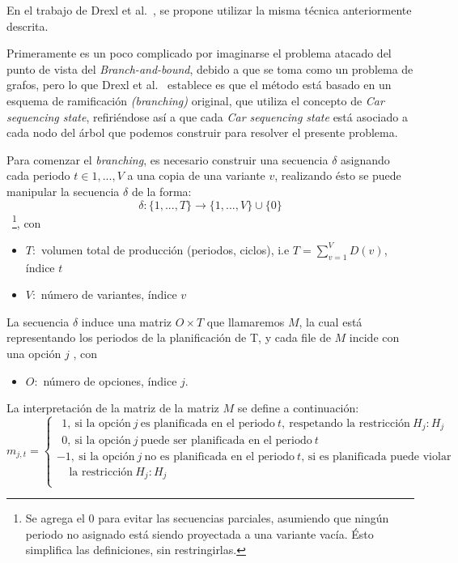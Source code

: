 En el trabajo de Drexl et al.~\cite{DKM06}, se propone utilizar la misma técnica anteriormente
descrita.

Primeramente es un poco complicado por imaginarse el problema atacado del punto de vista
del \emph{Branch-and-bound}, debido a que se toma como un problema de grafos, pero lo que
Drexl et al.~\cite{DKM06} establece es que el método está basado en un esquema de ramificación
\emph{(branching)} original, que utiliza el concepto de \emph{Car sequencing state}, 
refiriéndose así a que cada \emph{Car sequencing state} está asociado a cada nodo del árbol
que podemos construir para resolver el presente problema.

Para comenzar el \emph{branching}, es necesario construir una secuencia $\delta$
asignando cada periodo $t\in {1,...,V}$ a una copia de una variante $v$, realizando ésto
se puede manipular la secuencia $\delta$ de la forma:
$$\delta : \{1,...,T\}\rightarrow\{1,...,V\}\cup\{0\}$$~\footnote{
Se agrega el $0$ para evitar las secuencias parciales, asumiendo que ningún periodo no asignado
está siendo proyectada a una variante vacía. Ésto simplifica las definiciones, sin restringirlas.
}, con
\begin{itemize}
	\item $T:$ volumen total de producción (periodos, ciclos), i.e $T=\sum\limits_{v=1}^{V}D(v)$, índice $t$
	\item $V:$ número de variantes, índice $v$
\end{itemize}

La secuencia $\delta$ induce una matriz $O\times T$ que llamaremos $M$,
la cual está representando los periodos de la planificación de T,
y cada file de $M$ incide con una opción $j$
, con
\begin{itemize}
	\item $O:$ número de opciones, índice $j$.
\end{itemize}

La interpretación de la matriz de la matriz $M$ se define a continuación:\\

$m_{j,t} = \left\{ \begin{array}{l}
\ \ 1,\ \text{si la opción}\ j\ \text{es planificada en el periodo}\ t,\ \text{respetando la restricción}\ H_{j}:H_{j}\\
\ \ 0,\ \text{si la opción}\ j\ \text{puede ser planificada en el periodo}\ t\\
-1,\ \text{si la opción}\ j\ \text{no es planificada en el periodo}\ t\text{, si es planificada puede violar}\\
\ \ \ \ \ \text{la restricción}\ H_{j}:H_{j}\\
\end{array} \right.$

